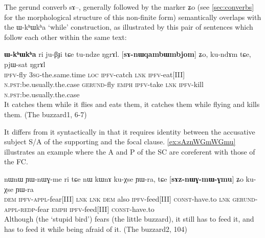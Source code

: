 \documentclass[oldfontcommands,oneside,a4paper,11pt]{article}
\newcommand{\ipa}[1]{{\phon \mbox{#1}}} %
\begin{document}
The gerund converb \ipa{sɤ}--, generally followed by the marker \ipa{ʑo} (see \ref{sec:converbs} for the morphological structure of this non-finite form)   semantically overlaps with the \ipa{ɯ-kʰɯkʰa} `while' construction, as illustrated by this pair of sentences which follow each other within the same text:

\begin{exe}
\ex \label{ex:sanWqambWmbjom}
\gll [\ipa{ɲɯ-nɯqambɯmbjom}]  \textbf{	\ipa{ɯ-kʰɯkʰa}}  	\ipa{ri}  	\ipa{ju-βɟi}  	\ipa{tɕe}  	\ipa{tu-ndze}  	\ipa{ŋgrɤl.}  	[\textbf{\ipa{sɤ-nɯqambɯmbjom}}]  	\ipa{ʑo,}  	\ipa{ku-ndɤm}  	\ipa{tɕe,}  	\ipa{pjɯ-sat}  	\ipa{ŋgrɤl}  \\
\textsc{ipfv}-fly \textsc{3sg}-the.same.time \textsc{loc} \textsc{ipfv}-catch \textsc{lnk} \textsc{ipfv}-eat[III] \textsc{n.pst}:be.usually.the.case 
\textsc{gerund}-fly \textsc{emph}
\textsc{ipfv}-take \textsc{lnk} \textsc{ipfv}-kill \textsc{n.pst}:be.usually.the.case 
\\
\glt It catches them while it flies and eats them, it catches them while flying and kills them. (The buzzard1, 6-7)
\end{exe} 
It differs from it syntactically in that it requires identity between the accusative subject S/A of the supporting and the focal clause. \ref{ex:sAznWGmWGmu} illustrates an example where the A and P of the SC are coreferent with those of the FC.

\begin{exe}
\ex \label{ex:sAznWGmWGmu}
\gll
 	\ipa{nɯnɯ}  	\ipa{ɲɯ-nɯɣ-me}  	\ipa{ri} \ipa{tɕe} 	\ipa{nɯ}  	\ipa{kɯnɤ}  	\ipa{ku-χse}  	\ipa{ɲɯ-ra,}  	\ipa{tɕe}  	[\textbf{\ipa{sɤz-nɯɣ-mɯ-ɣmu}}]  	\ipa{ʑo}  	\ipa{ku-χse}  	\ipa{ɲɯ-ra}  \\
 	\textsc{dem} \textsc{ipfv-appl}-fear[III] \textsc{lnk}  \textsc{lnk} \textsc{dem} also \textsc{ipfv}-feed[III] \textsc{const}-have.to \textsc{lnk} \textsc{gerund-appl-redp}-fear \textsc{emph} \textsc{ipfv}-feed[III] \textsc{const}-have.to \\
 	\glt Although (the `stupid bird') fears (the little buzzard), it still has to feed it, and has to feed it while being afraid of it. (The buzzard2, 104)
\end{exe}
\end{document}
